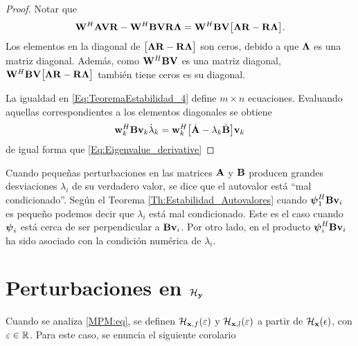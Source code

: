 \begin{proof}
			Notar que 
			\[\mathbf{W}^H\mathbf{A}\mathbf{V}\mathbf{R}-\mathbf{W}^H\mathbf{B}\mathbf{V}\mathbf{R}\boldsymbol{\Lambda} = \mathbf{W}^H\mathbf{B}\mathbf{V}\big[\boldsymbol{\Lambda}\mathbf{R}-\mathbf{R}\boldsymbol{\Lambda}\big].\]
			Los elementos en la diagonal de $\big[\boldsymbol{\Lambda}\mathbf{R}-\mathbf{R}\boldsymbol{\Lambda}\big]$ son ceros, debido a que $\boldsymbol{\Lambda}$ es una matriz diagonal. Además, como $\mathbf{W}^H\mathbf{B}\mathbf{V}$ es una matriz diagonal, $\mathbf{W}^H\mathbf{B}\mathbf{V}\big[\boldsymbol{\Lambda}\mathbf{R}-\mathbf{R}\boldsymbol{\Lambda}\big]$ también tiene ceros es su diagonal.
		
			La igualdad en \eqref{Eq:TeoremaEstabilidad_4} define  $m\times n$ ecuaciones. Evaluando aquellas correspondientes a los elementos diagonales se obtiene
			\[\mathbf{w}_k^H\mathbf{B}\mathbf{v}_k\dot{\lambda}_k = \mathbf{w}_k^H\big[\dot{\mathbf{A}}-\lambda_k\dot{\mathbf{B}}\big]\mathbf{v}_k\]
			de igual forma que \eqref{Eq:Eigenvalue_derivative}
		\end{proof}
	
		Cuando pequeñas perturbaciones en las matrices $\mathbf{A}$ y $\mathbf{B}$ producen grandes desviaciones $\lambda_i$ de su verdadero valor, se dice que el autovalor está ``mal condicionado''. Según el Teorema \eqref{Th:Estabilidad_Autovalores} cuando $\boldsymbol{\psi}_1^H\mathbf{B}\mathbf{v}_i$ es pequeño podemos decir que $\lambda_i$ está mal condicionado. Este es el caso cuando $\boldsymbol{\psi}_i$ está cerca de ser  perpendicular a $\mathbf{B}\mathbf{v}_i$. Por otro lado, en \cite[ch. 7]{Golub1996} el producto $\boldsymbol{\psi}_i^H\mathbf{B}\mathbf{v}_i$ ha sido asociado con la condición numérica de $\lambda_i$.
	
	\section{Perturbaciones en $\mathcal{H}_{\mathbf{y}}$}
	
		Cuando se analiza \eqref{MPM:eq}, se definen $\mathcal{H}_{\mathbf{x},f}(\varepsilon)$ y $\mathcal{H}_{\mathbf{x},l}(\varepsilon)$ a partir de $\mathcal{H}_{\mathbf{x}}(\epsilon)$, con $\varepsilon\in\mathbb{R}$. Para este caso, se enuncia el siguiente corolario
	
